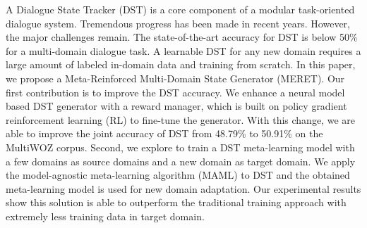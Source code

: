A Dialogue State Tracker (DST) is a core component of a modular task-oriented dialogue system. Tremendous progress has been made in recent years. However, the major challenges remain. The state-of-the-art accuracy for DST is below 50\% for a multi-domain dialogue task. A learnable DST for any new domain requires a large amount of labeled in-domain data and training from scratch. In this paper, we propose a Meta-Reinforced Multi-Domain State Generator (MERET). Our first contribution is to improve the DST accuracy. We enhance a neural model based DST generator with a reward manager, which is built on policy gradient reinforcement learning (RL) to fine-tune the generator. With this change, we are able to improve the joint accuracy of DST from 48.79\% to 50.91\% on the MultiWOZ corpus. Second, we explore to train a DST meta-learning model with a few domains as source domains and a new domain as target domain. We apply the model-agnostic meta-learning algorithm (MAML) to DST and the obtained meta-learning model is used for new domain adaptation. Our experimental results show this solution is able to outperform the traditional training approach with extremely less training data in target domain.

